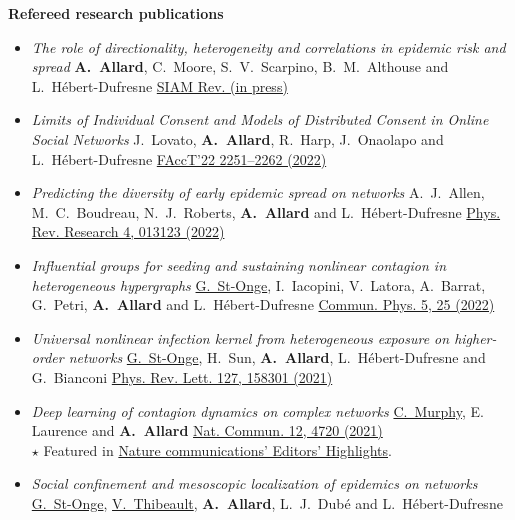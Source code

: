 \documentclass[11pt]{article}
\begin{document}
%
%
%
\textbf{Refereed research publications}
%
\begin{itemize}[itemsep=0.5em]\small
%
  \item \textit{The role of directionality, heterogeneity and correlations in epidemic risk and spread}\split
  \textbf{A.~Allard}, C.~Moore, S.~V.~Scarpino, B.~M.~Althouse and L.~H\'ebert-Dufresne\split
  \href{https://arxiv.org/abs/2005.11283}{SIAM Rev. (in press)}
%
  \item \textit{Limits of Individual Consent and Models of Distributed Consent in Online Social Networks}\split
  J.~Lovato, \textbf{A.~Allard}, R.~Harp, J.~Onaolapo and L.~H\'ebert-Dufresne\split
  \href{https://doi.org/10.1145/3531146.3534640}{FAccT'22 2251--2262 (2022)}
%
  \item \textit{Predicting the diversity of early epidemic spread on networks}\split
  A.~J.~Allen, M.~C.~Boudreau, N.~J.~Roberts, \textbf{A.~Allard} and L.~H\'ebert-Dufresne\split
  \href{https://doi.org/10.1103/PhysRevResearch.4.013123}{Phys. Rev. Research 4, 013123 (2022)}
%
  \item \textit{Influential groups for seeding and sustaining nonlinear contagion in heterogeneous hypergraphs}\split
  \uline{G.~St-Onge}, I.~Iacopini, V.~Latora, A.~Barrat, G.~Petri, \textbf{A.~Allard} and L.~H\'ebert-Dufresne\split
  \href{https://doi.org/10.1038/s42005-021-00788-w}{Commun. Phys. 5, 25 (2022)}
%
  \item \textit{Universal nonlinear infection kernel from heterogeneous exposure on higher-order networks}\split
  \uline{G.~St-Onge}, H.~Sun, \textbf{A.~Allard}, L.~H\'ebert-Dufresne and G.~Bianconi\split
  \href{https://doi.org/10.1103/PhysRevLett.127.158301}{Phys. Rev. Lett. 127, 158301 (2021)}
%
  \item \textit{Deep learning of contagion dynamics on complex networks}\split
  \uline{C.~Murphy}, E. Laurence and \textbf{A.~Allard}\split
  \href{https://arxiv.org/abs/2006.05410}{Nat. Commun. 12, 4720 (2021)}\\
  {\footnotesize $\star$ Featured in \href{https://www.nature.com/ncomms/editorshighlights}{Nature communications' Editors' Highlights}.}
%
  \item \textit{Social confinement and mesoscopic localization of epidemics on networks}\split
  \uline{G.~St-Onge}, \uline{V.~Thibeault}, \textbf{A.~Allard}, L.~J.~Dub\'e and L.~H\'ebert-Dufresne\split

\end{itemize}
\end{document}
